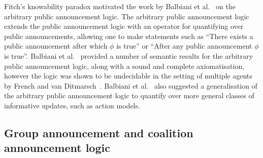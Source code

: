 Fitch's knowability paradox motivated the work by Balbiani et
al.~\cite{balbiani:2007} on the arbitrary public announcement logic. The
arbitrary public announcement logic extends the public announcement logic with
an operator for quantifying over public announcements, allowing one to make
statements such as ``There exists a public announcement after which $\phi$ is
true'' or ``After any public announcement $\phi$ is true''. Balbiani et
al.~\cite{balbiani:2007} provided a number of semantic results for the arbitrary
public announcement logic, along with a sound and complete axiomatisation,
however the logic was shown to be undecidable in the setting of multiple agents
by French and van Ditmarsch~\cite{french:2008}. Balbiani et
al.~\cite{balbiani:2007} also suggested a generalisation of the arbitrary public
announcement logic to quantify over more general classes of informative updates,
such as action models.


\subsection{Group announcement and coalition announcement logic}

